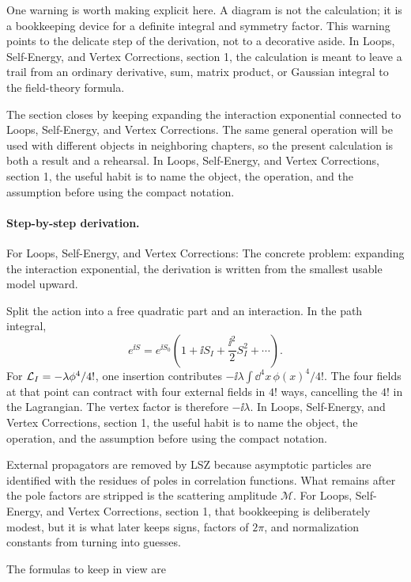 One warning is worth making explicit here.  A diagram is not the calculation; it is a bookkeeping device for a definite integral and symmetry factor.  This warning points to the delicate step of the derivation, not to a decorative aside.  In Loops, Self-Energy, and Vertex Corrections, section 1, the calculation is meant to leave a trail from an ordinary derivative, sum, matrix product, or Gaussian integral to the field-theory formula.

The section closes by keeping expanding the interaction exponential connected to Loops, Self-Energy, and Vertex Corrections.  The same general operation will be used with different objects in neighboring chapters, so the present calculation is both a result and a rehearsal.  In Loops, Self-Energy, and Vertex Corrections, section 1, the useful habit is to name the object, the operation, and the assumption before using the compact notation.



\paragraph{Step-by-step derivation.}

For Loops, Self-Energy, and Vertex Corrections: The concrete problem: expanding the interaction exponential, the derivation is written from the smallest usable model upward.

Split the action into a free quadratic part and an interaction.  In the path integral,
\[
  e^{\ii S}=e^{\ii S_0}\left(1+\ii S_I+\frac{\ii^2}{2}S_I^2+\cdots\right).
\]
For \(\mathcal L_I=-\lambda\phi^4/4!\), one insertion contributes \(-\ii\lambda\int\dd^4x\,\phi(x)^4/4!\).  The four fields at that point can contract with four external fields in \(4!\) ways, cancelling the \(4!\) in the Lagrangian.  The vertex factor is therefore \(-\ii\lambda\).  In Loops, Self-Energy, and Vertex Corrections, section 1, the useful habit is to name the object, the operation, and the assumption before using the compact notation.

External propagators are removed by LSZ because asymptotic particles are identified with the residues of poles in correlation functions.  What remains after the pole factors are stripped is the scattering amplitude \(\mathcal M\).  For Loops, Self-Energy, and Vertex Corrections, section 1, that bookkeeping is deliberately modest, but it is what later keeps signs, factors of \(2\pi\), and normalization constants from turning into guesses.

The formulas to keep in view are


